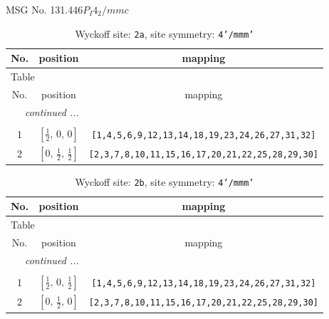 \documentclass[fleqn,8pt]{jsarticle}
\begin{document}
\setcounter{MaxMatrixCols}{32}

\renewcommand{\tablename}{Table~}
\renewcommand{\figurename}{Figure~}
\begin{center}
\LARGE
MSG No. 131.446\quad$P_{I}4_{2}/mmc$
\end{center}
\renewcommand{\arraystretch}{1.2}
\begin{longtable}{ccc}
\caption{Wyckoff site: {\tt 2a}, site symmetry: {\tt 4'/mmm'}}
 \\
 \hline \hline
No. & position & mapping \\ \hline \endfirsthead

\multicolumn{2}{l}{\tablename\ \thetable{}} \\
 \hline \hline
No. & position & mapping \\ \hline \endhead

 \hline \hline
\multicolumn{2}{r}{\footnotesize\it continued ...} \\ \endfoot

 \hline \hline
\multicolumn{2}{r}{} \\ \endlastfoot

1 & $\left[ \frac{1}{2},\, 0,\, 0 \right]$ & {\tt [1,4,5,6,9,12,13,14,18,19,23,24,26,27,31,32]} \\ \hline
2 & $\left[ 0,\, \frac{1}{2},\, \frac{1}{2} \right]$ & {\tt [2,3,7,8,10,11,15,16,17,20,21,22,25,28,29,30]} \\
\end{longtable}
\renewcommand{\arraystretch}{1.2}
\begin{longtable}{ccc}
\caption{Wyckoff site: {\tt 2b}, site symmetry: {\tt 4'/mmm'}}
 \\
 \hline \hline
No. & position & mapping \\ \hline \endfirsthead

\multicolumn{2}{l}{\tablename\ \thetable{}} \\
 \hline \hline
No. & position & mapping \\ \hline \endhead

 \hline \hline
\multicolumn{2}{r}{\footnotesize\it continued ...} \\ \endfoot

 \hline \hline
\multicolumn{2}{r}{} \\ \endlastfoot

1 & $\left[ \frac{1}{2},\, 0,\, \frac{1}{2} \right]$ & {\tt [1,4,5,6,9,12,13,14,18,19,23,24,26,27,31,32]} \\ \hline
2 & $\left[ 0,\, \frac{1}{2},\, 0 \right]$ & {\tt [2,3,7,8,10,11,15,16,17,20,21,22,25,28,29,30]} \\
\end{longtable}
\end{document}
